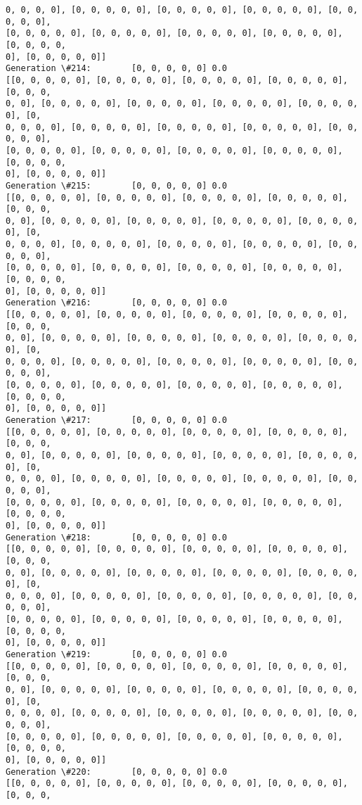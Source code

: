 \documentclass[11pt]{article}
\begin{document}
\begin{Verbatim}[commandchars=\\\{\}]
0, 0, 0, 0], [0, 0, 0, 0, 0], [0, 0, 0, 0, 0], [0, 0, 0, 0, 0], [0, 0, 0, 0, 0],
[0, 0, 0, 0, 0], [0, 0, 0, 0, 0], [0, 0, 0, 0, 0], [0, 0, 0, 0, 0], [0, 0, 0, 0,
0], [0, 0, 0, 0, 0]]
Generation \#214:        [0, 0, 0, 0, 0] 0.0
[[0, 0, 0, 0, 0], [0, 0, 0, 0, 0], [0, 0, 0, 0, 0], [0, 0, 0, 0, 0], [0, 0, 0,
0, 0], [0, 0, 0, 0, 0], [0, 0, 0, 0, 0], [0, 0, 0, 0, 0], [0, 0, 0, 0, 0], [0,
0, 0, 0, 0], [0, 0, 0, 0, 0], [0, 0, 0, 0, 0], [0, 0, 0, 0, 0], [0, 0, 0, 0, 0],
[0, 0, 0, 0, 0], [0, 0, 0, 0, 0], [0, 0, 0, 0, 0], [0, 0, 0, 0, 0], [0, 0, 0, 0,
0], [0, 0, 0, 0, 0]]
Generation \#215:        [0, 0, 0, 0, 0] 0.0
[[0, 0, 0, 0, 0], [0, 0, 0, 0, 0], [0, 0, 0, 0, 0], [0, 0, 0, 0, 0], [0, 0, 0,
0, 0], [0, 0, 0, 0, 0], [0, 0, 0, 0, 0], [0, 0, 0, 0, 0], [0, 0, 0, 0, 0], [0,
0, 0, 0, 0], [0, 0, 0, 0, 0], [0, 0, 0, 0, 0], [0, 0, 0, 0, 0], [0, 0, 0, 0, 0],
[0, 0, 0, 0, 0], [0, 0, 0, 0, 0], [0, 0, 0, 0, 0], [0, 0, 0, 0, 0], [0, 0, 0, 0,
0], [0, 0, 0, 0, 0]]
Generation \#216:        [0, 0, 0, 0, 0] 0.0
[[0, 0, 0, 0, 0], [0, 0, 0, 0, 0], [0, 0, 0, 0, 0], [0, 0, 0, 0, 0], [0, 0, 0,
0, 0], [0, 0, 0, 0, 0], [0, 0, 0, 0, 0], [0, 0, 0, 0, 0], [0, 0, 0, 0, 0], [0,
0, 0, 0, 0], [0, 0, 0, 0, 0], [0, 0, 0, 0, 0], [0, 0, 0, 0, 0], [0, 0, 0, 0, 0],
[0, 0, 0, 0, 0], [0, 0, 0, 0, 0], [0, 0, 0, 0, 0], [0, 0, 0, 0, 0], [0, 0, 0, 0,
0], [0, 0, 0, 0, 0]]
Generation \#217:        [0, 0, 0, 0, 0] 0.0
[[0, 0, 0, 0, 0], [0, 0, 0, 0, 0], [0, 0, 0, 0, 0], [0, 0, 0, 0, 0], [0, 0, 0,
0, 0], [0, 0, 0, 0, 0], [0, 0, 0, 0, 0], [0, 0, 0, 0, 0], [0, 0, 0, 0, 0], [0,
0, 0, 0, 0], [0, 0, 0, 0, 0], [0, 0, 0, 0, 0], [0, 0, 0, 0, 0], [0, 0, 0, 0, 0],
[0, 0, 0, 0, 0], [0, 0, 0, 0, 0], [0, 0, 0, 0, 0], [0, 0, 0, 0, 0], [0, 0, 0, 0,
0], [0, 0, 0, 0, 0]]
Generation \#218:        [0, 0, 0, 0, 0] 0.0
[[0, 0, 0, 0, 0], [0, 0, 0, 0, 0], [0, 0, 0, 0, 0], [0, 0, 0, 0, 0], [0, 0, 0,
0, 0], [0, 0, 0, 0, 0], [0, 0, 0, 0, 0], [0, 0, 0, 0, 0], [0, 0, 0, 0, 0], [0,
0, 0, 0, 0], [0, 0, 0, 0, 0], [0, 0, 0, 0, 0], [0, 0, 0, 0, 0], [0, 0, 0, 0, 0],
[0, 0, 0, 0, 0], [0, 0, 0, 0, 0], [0, 0, 0, 0, 0], [0, 0, 0, 0, 0], [0, 0, 0, 0,
0], [0, 0, 0, 0, 0]]
Generation \#219:        [0, 0, 0, 0, 0] 0.0
[[0, 0, 0, 0, 0], [0, 0, 0, 0, 0], [0, 0, 0, 0, 0], [0, 0, 0, 0, 0], [0, 0, 0,
0, 0], [0, 0, 0, 0, 0], [0, 0, 0, 0, 0], [0, 0, 0, 0, 0], [0, 0, 0, 0, 0], [0,
0, 0, 0, 0], [0, 0, 0, 0, 0], [0, 0, 0, 0, 0], [0, 0, 0, 0, 0], [0, 0, 0, 0, 0],
[0, 0, 0, 0, 0], [0, 0, 0, 0, 0], [0, 0, 0, 0, 0], [0, 0, 0, 0, 0], [0, 0, 0, 0,
0], [0, 0, 0, 0, 0]]
Generation \#220:        [0, 0, 0, 0, 0] 0.0
[[0, 0, 0, 0, 0], [0, 0, 0, 0, 0], [0, 0, 0, 0, 0], [0, 0, 0, 0, 0], [0, 0, 0,

\end{Verbatim}
\end{document}
